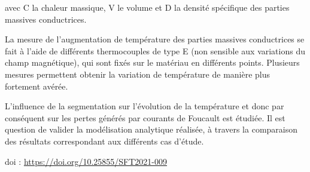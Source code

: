 {avec C la chaleur massique, V le volume et D la densité spécifique des parties massives conductrices.







La mesure de l'augmentation de température des parties massives conductrices se fait à l'aide de différents thermocouples de type E (non sensible aux variations du champ magnétique), qui sont fixés sur le matériau en différents points. Plusieurs mesures permettent obtenir la variation de température de manière plus fortement avérée.







L'influence de la segmentation sur l'évolution de la température et donc par conséquent sur les pertes générés par courants de Foucault est étudiée. Il est question de valider la modélisation analytique réalisée, à travers la comparaison des résultats correspondant aux différents cas d'étude.

 \vfill doi : \url{https://doi.org/10.25855/SFT2021-009}

}
 
